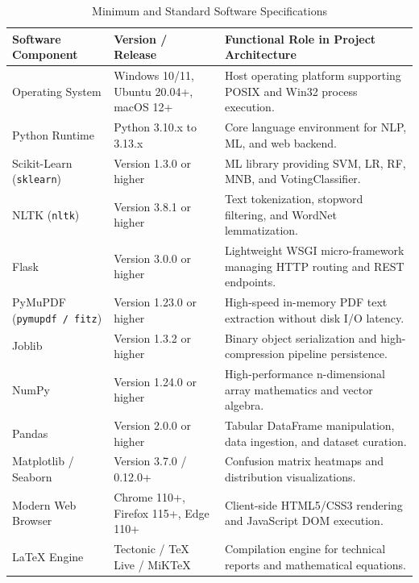 \begin{table}[H]
\centering
\footnotesize
\renewcommand{\arraystretch}{0.92}
\begin{tabularx}{\linewidth}{|>{\raggedright\arraybackslash}p{3.6cm}|>{\raggedright\arraybackslash}p{2.8cm}|>{\raggedright\arraybackslash}X|}
\hline
\textbf{Software Component} & \textbf{Version / Release} & \textbf{Functional Role in Project Architecture} \\
\hline
Operating System & Windows 10/11, Ubuntu 20.04+, macOS 12+ & Host operating platform supporting POSIX and Win32 process execution. \\
\hline
Python Runtime & Python 3.10.x to 3.13.x & Core language environment for NLP, ML, and web backend. \\
\hline
Scikit-Learn (\texttt{sklearn}) & Version 1.3.0 or higher & ML library providing SVM, LR, RF, MNB, and VotingClassifier. \\
\hline
NLTK (\texttt{nltk}) & Version 3.8.1 or higher & Text tokenization, stopword filtering, and WordNet lemmatization. \\
\hline
Flask & Version 3.0.0 or higher & Lightweight WSGI micro-framework managing HTTP routing and REST endpoints. \\
\hline
PyMuPDF (\texttt{pymupdf / fitz}) & Version 1.23.0 or higher & High-speed in-memory PDF text extraction without disk I/O latency. \\
\hline
Joblib & Version 1.3.2 or higher & Binary object serialization and high-compression pipeline persistence. \\
\hline
NumPy & Version 1.24.0 or higher & High-performance n-dimensional array mathematics and vector algebra. \\
\hline
Pandas & Version 2.0.0 or higher & Tabular DataFrame manipulation, data ingestion, and dataset curation. \\
\hline
Matplotlib / Seaborn & Version 3.7.0 / 0.12.0+ & Confusion matrix heatmaps and distribution visualizations. \\
\hline
Modern Web Browser & Chrome 110+, Firefox 115+, Edge 110+ & Client-side HTML5/CSS3 rendering and JavaScript DOM execution. \\
\hline
LaTeX Engine & Tectonic / TeX Live / MiKTeX & Compilation engine for technical reports and mathematical equations. \\
\hline
\end{tabularx}
\caption{Minimum and Standard Software Specifications}
\label{tab:software_requirements}
\end{table}

